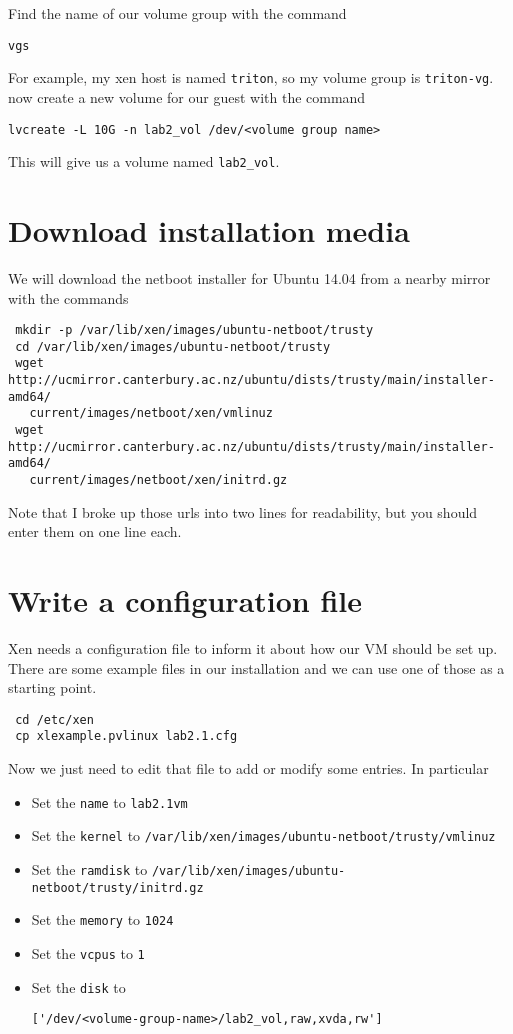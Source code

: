 \documentclass{article}
\begin{document}
 Find the name of our volume group with the command
 
 \texttt{vgs}
 
 For example, my xen host is named \texttt{triton}, so my volume group is \texttt{triton-vg}.
 now create a new volume for our guest with the command 
 
 \texttt{lvcreate -L 10G -n lab2\_vol /dev/<volume group name>}
 
 This will give us a volume named \texttt{lab2\_vol}.

 \section{Download installation media}
 We will download the netboot installer for Ubuntu 14.04 from a nearby mirror with the commands
 
 \begin{verbatim}
 mkdir -p /var/lib/xen/images/ubuntu-netboot/trusty
 cd /var/lib/xen/images/ubuntu-netboot/trusty
 wget http://ucmirror.canterbury.ac.nz/ubuntu/dists/trusty/main/installer-amd64/
   current/images/netboot/xen/vmlinuz
 wget http://ucmirror.canterbury.ac.nz/ubuntu/dists/trusty/main/installer-amd64/
   current/images/netboot/xen/initrd.gz
 \end{verbatim}
 
 Note that I broke up those urls into two lines for readability, but you should enter them on one line each.
 
 \section{Write a configuration file}
 Xen needs a configuration file to inform it about how our VM should be set up. There are some example files in our installation
 and we can use one of those as a starting point.
 
 \begin{verbatim}
 cd /etc/xen
 cp xlexample.pvlinux lab2.1.cfg
 \end{verbatim}
 
 Now we just need to edit that file to add or modify some entries. In particular
 
 \begin{itemize}
  \item Set the \texttt{name} to \texttt{lab2.1vm}
  \item Set the \texttt{kernel} to \texttt{/var/lib/xen/images/ubuntu-netboot/trusty/vmlinuz}
  \item Set the \texttt{ramdisk} to \texttt{/var/lib/xen/images/ubuntu-netboot/trusty/initrd.gz}
  \item Set the \texttt{memory} to \texttt{1024}
   \item Set the \texttt{vcpus} to \texttt{1}
   \item Set the \texttt{disk} to \begin{verbatim}['/dev/<volume-group-name>/lab2_vol,raw,xvda,rw']\end{verbatim}
 \end{itemize}
 
\end{document}
